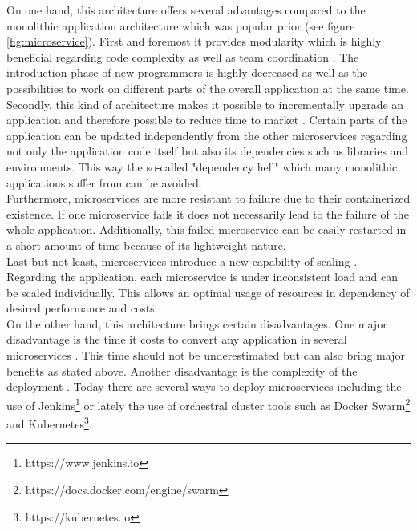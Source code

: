\documentclass[
	english,
	ruledheaders=section,%
	class=report,%
	thesis={type=master},%
	accentcolor=8c,%
	custommargins=true,%
	marginpar=false,%
	parskip=half-,%
	fontsize=11pt,%
]{tudapub}
\begin{document}
On one hand, this architecture offers several advantages compared to the monolithic application architecture which was popular prior (see figure \ref{fig:microservice}).
First and foremost it provides modularity which is highly beneficial regarding code complexity as well as team coordination \cite{dragoni2017microservices}. The introduction phase of new programmers is highly decreased as well as the possibilities to work on different parts of the overall application at the same time.\\

Secondly, this kind of architecture makes it possible to incrementally upgrade an application and therefore possible to reduce time to market \cite{dragoni2017microservices}. Certain parts of the application can be updated independently from the other microservices regarding not only the application code itself but also its dependencies such as libraries and environments. This way the so-called "dependency hell" \cite{merkel2014docker} which many monolithic applications suffer from can be avoided.\\

Furthermore, microservices are more resistant to failure due to their containerized existence. If one microservice fails it does not necessarily lead to the failure of the whole application. Additionally, this failed microservice can be easily restarted in a short amount of time because of its lightweight nature.\\

Last but not least, microservices introduce a new capability of scaling \cite{dragoni2017microservices, namiot2014micro}. Regarding the application, each microservice is under inconsistent load and can be scaled individually. This allows an optimal usage of resources in dependency of desired performance and costs.\\

On the other hand, this architecture brings certain disadvantages.
One major disadvantage is the time it costs to convert any application in several microservices \cite{dragoni2017microservices}. This time should not be underestimated but can also bring major benefits as stated above.
Another disadvantage is the complexity of the deployment \cite{dragoni2017microservices}. Today there are several ways to deploy microservices including the use of Jenkins\footnote{https://www.jenkins.io} or lately the use of orchestral cluster tools such as Docker Swarm\footnote{https://docs.docker.com/engine/swarm} and Kubernetes\footnote{https://kubernetes.io}.\\
\end{document}
